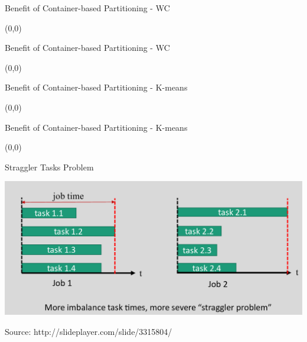 \documentclass[english]{beamer} %
\begin{document}
\begin{frame}{Benefit of Container-based Partitioning - WC}
\begin{textblock}{1}(0,0)
\end{textblock} 
\end{frame}

\begin{frame}{Benefit of Container-based Partitioning - WC}
\begin{textblock}{1}(0,0)
\end{textblock} 
\end{frame}

\begin{frame}{Benefit of Container-based Partitioning - K-means}
\begin{textblock}{1}(0,0)
\end{textblock} 
\end{frame}

\begin{frame}{Benefit of Container-based Partitioning - K-means}
\begin{textblock}{1}(0,0)
\end{textblock} 
\end{frame}

\begin{frame}{Straggler Tasks Problem}
\begin{center}
\includegraphics[scale=0.3]{fig/straggler}
\end{center}
Source: http://slideplayer.com/slide/3315804/
\end{frame}
\end{document}
